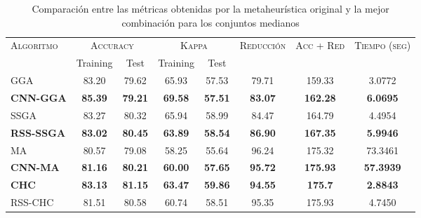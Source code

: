 \begin{table}[h!]
\centering
\begin{adjustbox}{max width =\textwidth}
\begin{tabular}{l c c c c c c c}
\hline
\multirow{2}{*}{\textsc{Algoritmo}}
	& \multicolumn{2}{c}{\textsc{Accuracy}}
	& \multicolumn{2}{c}{\textsc{Kappa}}
	& \textsc{Reducción}
	& \textsc{Acc + Red}
	& \textsc{Tiempo (seg)} \\
	& Training & Test
	& Training & Test \\ 
\hline
\hline

GGA  & 83.20 & 79.62 & 65.93 & 57.53 & 79.71 & 159.33 & 3.0772 \\
\textbf{CNN-GGA}      & \textbf{85.39} & \textbf{79.21} & \textbf{69.58} & \textbf{57.51} & \textbf{83.07} & \textbf{162.28} & \textbf{6.0695} \\

\hline

SSGA & 83.27 & 80.32 & 65.94 & 58.99 & 84.47 & 164.79 & 4.4954 \\
\textbf{RSS-SSGA} & \textbf{83.02} & \textbf{80.45} & \textbf{63.89} & \textbf{58.54} & \textbf{86.90} & \textbf{167.35} & \textbf{5.9946} \\

\hline

MA   & 80.57 & 79.08 & 58.25 & 55.64 & 96.24 & 175.32 & 73.3461 \\
\textbf{CNN-MA} & \textbf{81.16} & \textbf{80.21} & \textbf{60.00} & \textbf{57.65} & \textbf{95.72} & \textbf{175.93} & \textbf{57.3939} \\

\hline

\textbf{CHC}  & \textbf{83.13} & \textbf{81.15} & \textbf{63.47} & \textbf{59.86} & \textbf{94.55} & \textbf{175.7}  & \textbf{2.8843} \\
RSS-CHC & 81.51 & 80.58 & 60.74 & 58.51 & 95.35 & 175.93 & 4.7450 \\

\hline
\end{tabular}
\end{adjustbox}
\caption{Comparación entre las métricas obtenidas por la metaheurística original y la mejor combinación para los conjuntos medianos}
\label{med-best-all}

\end{table}

